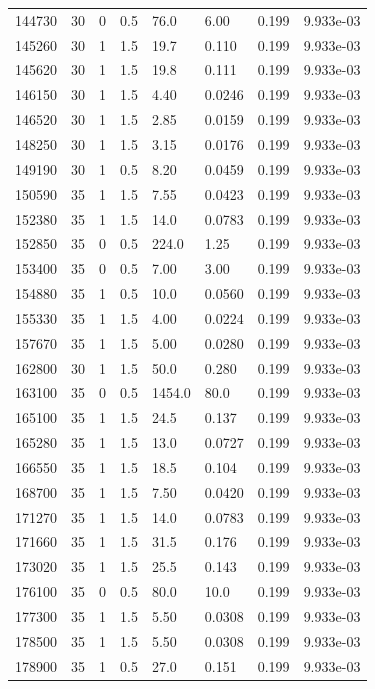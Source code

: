 \documentclass[preview]{standalone}
\begin{document}
{{{\begin{tabular}{L{1.2cm}C{1.2cm} C{0.3cm}C{0.5cm} C{1.4cm}C{1.4cm} C{1.4cm}C{1.4cm}}
  144730  &    30  & 0     & 0.5 &  76.0  & 6.00  & 0.199 &  9.933e-03   \\ 
  145260  &    30  & 1     & 1.5 &  19.7  & 0.110  & 0.199 &  9.933e-03   \\ 
  145620  &    30  & 1     & 1.5 &  19.8  & 0.111  & 0.199 &  9.933e-03   \\ 
  146150  &    30  & 1     & 1.5 &  4.40  & 0.0246  & 0.199 &  9.933e-03   \\ 
  146520  &    30  & 1     & 1.5 &  2.85  & 0.0159  & 0.199 &  9.933e-03   \\ 
  148250  &    30  & 1     & 1.5 &  3.15  & 0.0176  & 0.199 &  9.933e-03   \\ 
  149190  &    30  & 1     & 0.5 &  8.20  & 0.0459  & 0.199 &  9.933e-03   \\ 
  150590  &    35  & 1     & 1.5 &  7.55  & 0.0423  & 0.199 &  9.933e-03   \\ 
  152380  &    35  & 1     & 1.5 &  14.0  & 0.0783  & 0.199 &  9.933e-03   \\ 
  152850  &    35  & 0     & 0.5 &  224.0  & 1.25  & 0.199 &  9.933e-03   \\ 
  153400  &    35  & 0     & 0.5 &  7.00  & 3.00  & 0.199 &  9.933e-03   \\ 
  154880  &    35  & 1     & 0.5 &  10.0  & 0.0560  & 0.199 &  9.933e-03   \\ 
  155330  &    35  & 1     & 1.5 &  4.00  & 0.0224  & 0.199 &  9.933e-03   \\ 
  157670  &    35  & 1     & 1.5 &  5.00  & 0.0280  & 0.199 &  9.933e-03   \\ 
  162800  &    30  & 1     & 1.5 &  50.0  & 0.280  & 0.199 &  9.933e-03   \\ 
  163100  &    35  & 0     & 0.5 &  1454.0  & 80.0  & 0.199 &  9.933e-03   \\ 
  165100  &    35  & 1     & 1.5 &  24.5  & 0.137  & 0.199 &  9.933e-03   \\ 
  165280  &    35  & 1     & 1.5 &  13.0  & 0.0727  & 0.199 &  9.933e-03   \\ 
  166550  &    35  & 1     & 1.5 &  18.5  & 0.104  & 0.199 &  9.933e-03   \\ 
  168700  &    35  & 1     & 1.5 &  7.50  & 0.0420  & 0.199 &  9.933e-03   \\ 
  171270  &    35  & 1     & 1.5 &  14.0  & 0.0783  & 0.199 &  9.933e-03   \\ 
  171660  &    35  & 1     & 1.5 &  31.5  & 0.176  & 0.199 &  9.933e-03   \\ 
  173020  &    35  & 1     & 1.5 &  25.5  & 0.143  & 0.199 &  9.933e-03   \\ 
  176100  &    35  & 0     & 0.5 &  80.0  & 10.0  & 0.199 &  9.933e-03   \\ 
  177300  &    35  & 1     & 1.5 &  5.50  & 0.0308  & 0.199 &  9.933e-03   \\ 
  178500  &    35  & 1     & 1.5 &  5.50  & 0.0308  & 0.199 &  9.933e-03   \\ 
  178900  &    35  & 1     & 0.5 &  27.0  & 0.151  & 0.199 &  9.933e-03   \\ 
\hline 
\end{tabular} 

}}}
\end{document}
